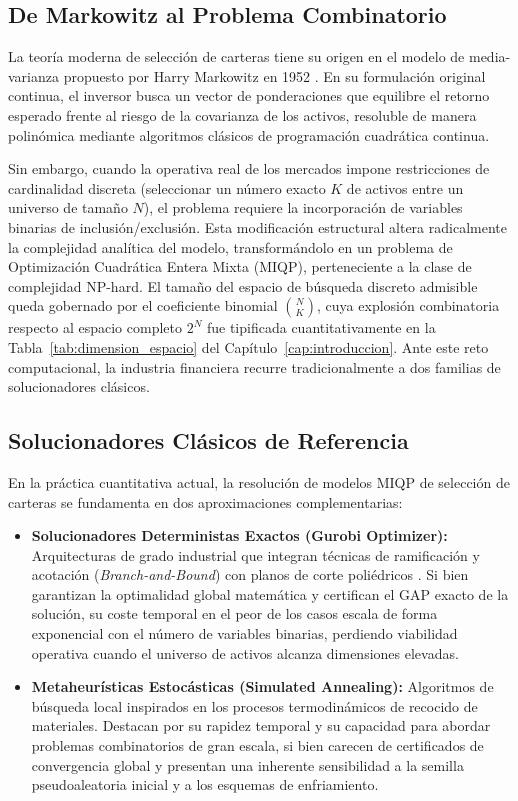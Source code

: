 \subsection{De Markowitz al Problema Combinatorio}
\label{subsec:markowitz_combinatorio}

La teoría moderna de selección de carteras tiene su origen en el modelo de media-varianza propuesto por Harry Markowitz en 1952 \cite{Markowitz1952}. En su formulación original continua, el inversor busca un vector de ponderaciones que equilibre el retorno esperado frente al riesgo de la covarianza de los activos, resoluble de manera polinómica mediante algoritmos clásicos de programación cuadrática continua.

Sin embargo, cuando la operativa real de los mercados impone restricciones de cardinalidad discreta (seleccionar un número exacto $K$ de activos entre un universo de tamaño $N$), el problema requiere la incorporación de variables binarias de inclusión/exclusión. Esta modificación estructural altera radicalmente la complejidad analítica del modelo, transformándolo en un problema de Optimización Cuadrática Entera Mixta (MIQP), perteneciente a la clase de complejidad NP-hard. El tamaño del espacio de búsqueda discreto admisible queda gobernado por el coeficiente binomial $\binom{N}{K}$, cuya explosión combinatoria respecto al espacio completo $2^N$ fue tipificada cuantitativamente en la Tabla~\ref{tab:dimension_espacio} del Capítulo~\ref{cap:introduccion}. Ante este reto computacional, la industria financiera recurre tradicionalmente a dos familias de solucionadores clásicos.

\subsection{Solucionadores Clásicos de Referencia}
\label{subsec:solucionadores_clasicos}

En la práctica cuantitativa actual, la resolución de modelos MIQP de selección de carteras se fundamenta en dos aproximaciones complementarias:

\begin{itemize}
    \item \textbf{Solucionadores Deterministas Exactos (Gurobi Optimizer):} Arquitecturas de grado industrial que integran técnicas de ramificación y acotación (\textit{Branch-and-Bound}) con planos de corte poliédricos \cite{Gurobi2025}. Si bien garantizan la optimalidad global matemática y certifican el GAP exacto de la solución, su coste temporal en el peor de los casos escala de forma exponencial con el número de variables binarias, perdiendo viabilidad operativa cuando el universo de activos alcanza dimensiones elevadas.
    
    \item \textbf{Metaheurísticas Estocásticas (Simulated Annealing):} Algoritmos de búsqueda local inspirados en los procesos termodinámicos de recocido de materiales. Destacan por su rapidez temporal y su capacidad para abordar problemas combinatorios de gran escala, si bien carecen de certificados de convergencia global y presentan una inherente sensibilidad a la semilla pseudoaleatoria inicial y a los esquemas de enfriamiento.
\end{itemize}


